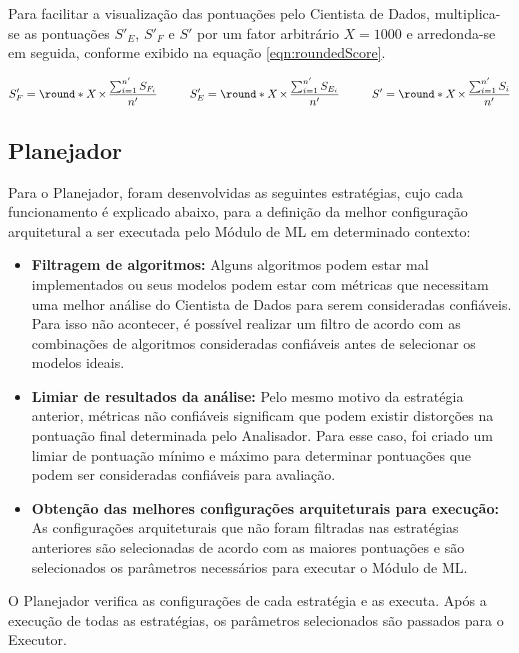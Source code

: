 \documentclass[Portugues,Final]{ic-tese-v3}
\DeclarePairedDelimiter{\round}\lfloor\rceil
\let\oldtimes\times
\def\times{{\mkern1mu\oldtimes\mkern1mu}}
\begin{document}
Para facilitar a visualização das pontuações pelo Cientista de Dados, multiplica-se as pontuações $S'_E$, $S'_F$ e $S'$ por um fator arbitrário $X = 1000$ e arredonda-se em seguida, conforme exibido na equação \ref{eqn:roundedScore}.

\begin{equation}
\label{eqn:roundedScore}
	S'_F = \round*{X \times \frac{\sum_{i=1}^{n'} S_{F_i}}{n'}}\;\;\;\;\;\;\;\;\;\;
	S'_E = \round*{X \times \frac{\sum_{i=1}^{n'} S_{E_i}}{n'}}\;\;\;\;\;\;\;\;\;\;
	S' = \round*{X \times \frac{\sum_{i=1}^{n'} S_i}{n'}}
\end{equation}

\subsection{Planejador}

Para o Planejador, foram desenvolvidas as seguintes estratégias, cujo cada funcionamento é explicado abaixo, para a definição da melhor configuração arquitetural a ser executada pelo Módulo de ML em determinado contexto:

\begin{itemize}
\item \textbf{Filtragem de algoritmos:} Alguns algoritmos podem estar mal implementados ou seus modelos podem estar com métricas que necessitam uma melhor análise do Cientista de Dados para serem consideradas confiáveis. Para isso não acontecer, é possível realizar um filtro de acordo com as combinações de algoritmos consideradas confiáveis antes de selecionar os modelos ideais.
\item \textbf{Limiar de resultados da análise:} Pelo mesmo motivo da estratégia anterior, métricas não confiáveis significam que podem existir distorções na pontuação final determinada pelo Analisador. Para esse caso, foi criado um limiar de pontuação mínimo e máximo para determinar pontuações que podem ser consideradas confiáveis para avaliação.
\item \textbf{Obtenção das melhores configurações arquiteturais para execução:} As configurações arquiteturais que não foram filtradas nas estratégias anteriores são selecionadas de acordo com as maiores pontuações e são selecionados os parâmetros necessários para executar o Módulo de ML.
\end{itemize}

O Planejador verifica as configurações de cada estratégia e as executa. Após a execução de todas as estratégias, os parâmetros selecionados são passados para o Executor.
\end{document}
